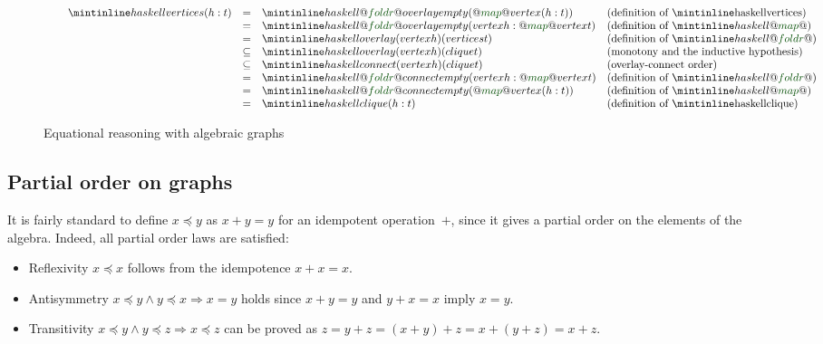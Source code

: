 \begin{figure}
\[
\begin{array}{rcll}
\hspace{6mm}\hs{vertices (h:t)} & = & \hs{@\std{foldr}@ overlay empty (@\std{map}@ vertex (h:t))} & \text{(definition of \hs{vertices})}\\
 & = & \hs{@\std{foldr}@ overlay empty (vertex h : @\std{map}@ vertex t)} & \text{(definition of }\hs{@\std{map}@}\text{)}\\
 & = & \hs{overlay (vertex h) (vertices t)} & \text{(definition of }\hs{@\std{foldr}@}\text{)}\\
 & \subseteq & \hs{overlay (vertex h) (clique t)} & \text{(monotony and the inductive hypothesis)}\\
 & \subseteq & \hs{connect (vertex h) (clique t)} & \text{(overlay-connect order)}\\
 & = & \hs{@\std{foldr}@ connect empty (vertex h : @\std{map}@ vertex t)} & \text{(definition of }\hs{@\std{foldr}@}\text{)}\\
 & = & \hs{@\std{foldr}@ connect empty (@\std{map}@ vertex (h:t))} & \text{(definition of }\hs{@\std{map}@}\text{)}\\
 & = & \hs{clique (h:t)} & \text{(definition of \hs{clique})}\\
\end{array}
\]
\caption{Equational reasoning with algebraic graphs\label{fig-proof}}
\end{figure}

\subsection{Partial order on graphs}\label{sub-partial-order}

It is fairly standard to define $x \preceq y$ as $x + y = y$ for an
idempotent operation~$+$, since it gives a partial order on the elements
of the algebra. Indeed, all partial order laws are satisfied:

\begin{itemize}
     \item Reflexivity $x \preceq x$ follows from the idempotence $x + x = x$.
     \item Antisymmetry $x \preceq y \wedge y \preceq x \Rightarrow x = y$ holds
     since $x + y = y$ and $y + x = x$ imply $x = y$.
     \item Transitivity $x \preceq y \wedge y \preceq z \Rightarrow x \preceq z$
     can be proved as $z = y + z = (x + y) + z = x + (y + z) = x + z$.
 \end{itemize}

